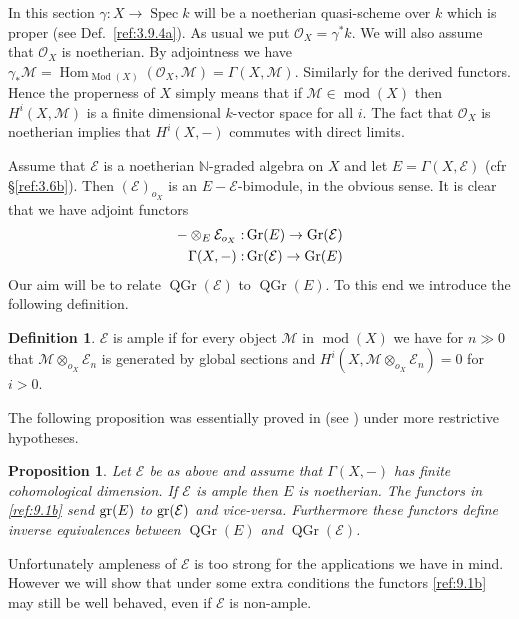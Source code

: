 \documentclass{amsproc}
\def \NN{{\mathbb N}}
\def\Escr{{\mathcal E}}
\def\Mscr{{\mathcal M}}
\def\Oscr{{\mathcal O}}
\def\gr{\mathop{\text{gr}}}
\def\Gr{\mathop{\text{Gr}}}
\def\gr{\operatorname {gr}}
\def\Spec{\operatorname {Spec}}
\def\Hom{\operatorname {Hom}}
\def\coh{\operatorname {mod}}
\def\gr{\operatorname {gr}}
\def\Qch{\operatorname {Mod}}
\def\r{\rightarrow}
\let\oldtext\text
\def\text#1{\oldtext{\upshape #1}}
\DeclareMathOperator{\QGr}{QGr}
\newtheorem{propositions}[lemmas]{Proposition}
\theoremstyle{definition}
\newtheorem{definitions}[lemmas]{Definition}
\theoremstyle{remark}
\numberwithin{equation}{section}
\numberwithin{table}{section}
\numberwithin{figure}{section}
\def\gr{\mathop{\text{gr}}}
\def\Gr{\mathop{\text{Gr}}}
\begin{document}
In this section $\gamma:X\r \Spec k$ will be a noetherian quasi-scheme
over $k$ which is proper (see Def.\ \ref{ref:3.9.4a}). As
usual we put $\Oscr_X=\gamma^\ast k$.  We will also assume that
$\Oscr_X$ is noetherian.  By adjointness we have $\gamma_\ast
\Mscr=\Hom_{\Qch(X)}(\Oscr_X,\Mscr)=\Gamma(X,\Mscr)$. Similarly for
the derived functors. Hence the properness of $X$ simply means that if
$\Mscr\in \coh(X)$ then $H^i(X,\Mscr)$ is a finite dimensional
$k$-vector space for all $i$. The fact that $\Oscr_X$ is noetherian
implies that $H^i(X,-)$ commutes with direct limits.

Assume that $\Escr$ is a noetherian $\NN$-graded algebra on $X$ and
let $E=\Gamma(X,\Escr)$ (cfr \S\ref{ref:3.6b}). Then
$(\Escr)_{o_X}$ is an $E-\Escr$-bimodule, in the obvious sense. It is
clear that we have adjoint functors
\begin{equation}
\label{ref:9.1b}
\begin{split}
-\otimes_E \Escr_{o_X}:&\Gr(E)\r \Gr(\Escr) \\
\Gamma(X,-):&\Gr(\Escr)\r \Gr (E)
\end{split}
\end{equation}
Our aim will be to  relate $\QGr(\Escr)$ to $\QGr(E)$. To this end we
introduce the following definition.


\begin{definitions}
$\Escr$ is ample if for every  object $\Mscr$ in $\coh(X)$ we
have for $n\gg 0$  that $\Mscr\otimes_{o_X} \Escr_n$ is generated by
global sections and 
$H^i(X,\Mscr\otimes_{o_X} \Escr_n)=0$  for  $i>0$.
\end{definitions}
The following proposition was essentially proved in \cite{AVdB,VdB11} 
(see \cite[Thm 5.2]{VdB11}) under
more restrictive hypotheses. 
\begin{propositions} 
\label{ref:9.1.2a}
Let $\Escr$ be as above and assume that $\Gamma(X,-)$ has finite
cohomological dimension.
If $\Escr$ is ample then $E$ is noetherian. The functors in
\eqref{ref:9.1b} send $\gr(E)$ to $\gr(\Escr)$ and vice-versa.
Furthermore these functors define inverse equivalences between $\QGr(E)$
and $\QGr(\Escr)$.
\end{propositions}

Unfortunately ampleness of $\Escr$ is too strong for the
applications we have in mind. However we will show that under some extra
conditions the functors \eqref{ref:9.1b} may still be well behaved,
even if $\Escr$ is non-ample.
\end{document}
